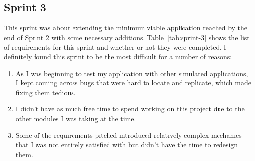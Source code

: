 \subsection{Sprint 3}

This sprint was about extending the minimum viable application reached by the end of Sprint 2 with some necessary additions. Table~\ref{tab:sprint-3} shows the list of requirements for this sprint and whether or not they were completed.
\x
I definitely found this sprint to be the most difficult for a number of reasons:

\begin{enumerate}
  \item As I was beginning to test my application with other simulated applications, I kept coming across bugs that were hard to locate and replicate, which made fixing them tedious.
  \item I didn't have as much free time to spend working on this project due to the other modules I was taking at the time.
  \item Some of the requirements pitched introduced relatively complex mechanics that I was not entirely satisfied with but didn't have the time to redesign them.  
\end{enumerate}

